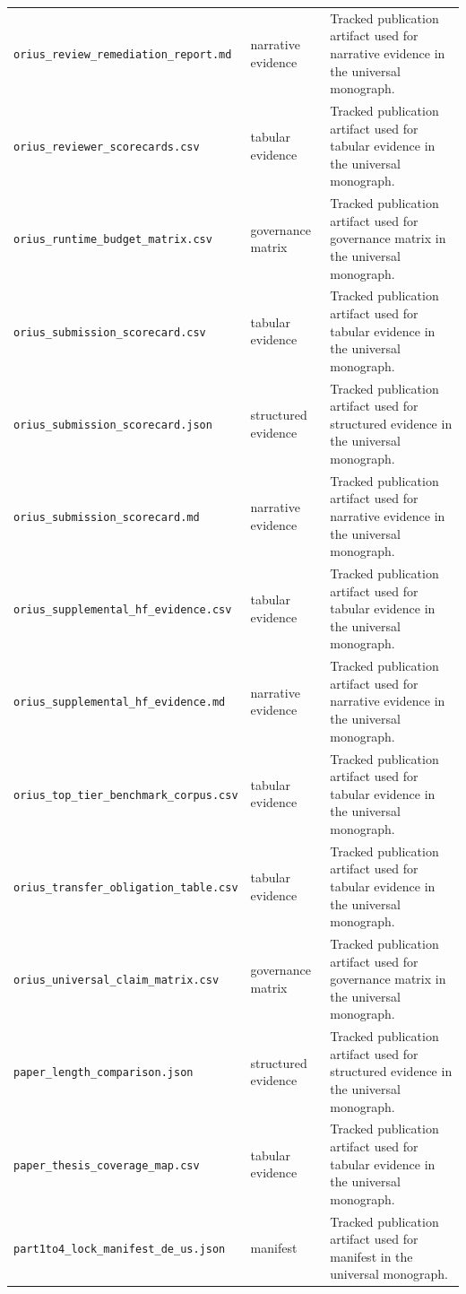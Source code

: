 \begin{longtable}{p{}p{}p{}}
\texttt{orius\_review\_remediation\_report.md} & narrative evidence & Tracked publication artifact used for narrative evidence in the universal monograph.\\
\texttt{orius\_reviewer\_scorecards.csv} & tabular evidence & Tracked publication artifact used for tabular evidence in the universal monograph.\\
\texttt{orius\_runtime\_budget\_matrix.csv} & governance matrix & Tracked publication artifact used for governance matrix in the universal monograph.\\
\texttt{orius\_submission\_scorecard.csv} & tabular evidence & Tracked publication artifact used for tabular evidence in the universal monograph.\\
\texttt{orius\_submission\_scorecard.json} & structured evidence & Tracked publication artifact used for structured evidence in the universal monograph.\\
\texttt{orius\_submission\_scorecard.md} & narrative evidence & Tracked publication artifact used for narrative evidence in the universal monograph.\\
\texttt{orius\_supplemental\_hf\_evidence.csv} & tabular evidence & Tracked publication artifact used for tabular evidence in the universal monograph.\\
\texttt{orius\_supplemental\_hf\_evidence.md} & narrative evidence & Tracked publication artifact used for narrative evidence in the universal monograph.\\
\texttt{orius\_top\_tier\_benchmark\_corpus.csv} & tabular evidence & Tracked publication artifact used for tabular evidence in the universal monograph.\\
\texttt{orius\_transfer\_obligation\_table.csv} & tabular evidence & Tracked publication artifact used for tabular evidence in the universal monograph.\\
\texttt{orius\_universal\_claim\_matrix.csv} & governance matrix & Tracked publication artifact used for governance matrix in the universal monograph.\\
\texttt{paper\_length\_comparison.json} & structured evidence & Tracked publication artifact used for structured evidence in the universal monograph.\\
\texttt{paper\_thesis\_coverage\_map.csv} & tabular evidence & Tracked publication artifact used for tabular evidence in the universal monograph.\\
\texttt{part1to4\_lock\_manifest\_de\_us.json} & manifest & Tracked publication artifact used for manifest in the universal monograph.\\

\end{longtable}
